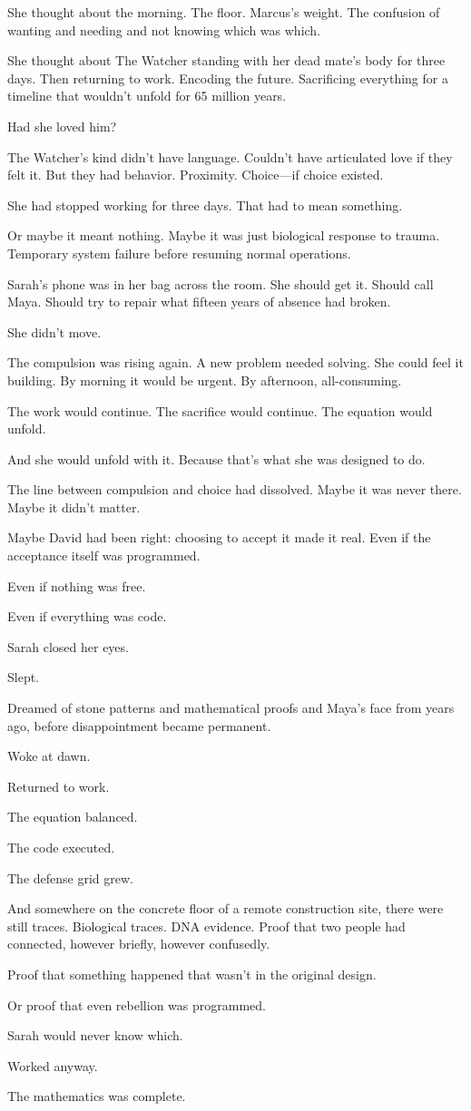She thought about the morning. The floor. Marcus's weight. The confusion of wanting and needing and not knowing which was which.

She thought about The Watcher standing with her dead mate's body for three days. Then returning to work. Encoding the future. Sacrificing everything for a timeline that wouldn't unfold for 65 million years.

Had she loved him?

The Watcher's kind didn't have language. Couldn't have articulated love if they felt it. But they had behavior. Proximity. Choice—if choice existed.

She had stopped working for three days. That had to mean something.

Or maybe it meant nothing. Maybe it was just biological response to trauma. Temporary system failure before resuming normal operations.

Sarah's phone was in her bag across the room. She should get it. Should call Maya. Should try to repair what fifteen years of absence had broken.

She didn't move.

The compulsion was rising again. A new problem needed solving. She could feel it building. By morning it would be urgent. By afternoon, all-consuming.

The work would continue. The sacrifice would continue. The equation would unfold.

And she would unfold with it. Because that's what she was designed to do.

The line between compulsion and choice had dissolved. Maybe it was never there. Maybe it didn't matter.

Maybe David had been right: choosing to accept it made it real. Even if the acceptance itself was programmed.

Even if nothing was free.

Even if everything was code.

Sarah closed her eyes.

Slept.

Dreamed of stone patterns and mathematical proofs and Maya's face from years ago, before disappointment became permanent.

Woke at dawn.

Returned to work.

The equation balanced.

The code executed.

The defense grid grew.

And somewhere on the concrete floor of a remote construction site, there were still traces. Biological traces. DNA evidence. Proof that two people had connected, however briefly, however confusedly.

Proof that something happened that wasn't in the original design.

Or proof that even rebellion was programmed.

Sarah would never know which.

Worked anyway.

The mathematics was complete.

